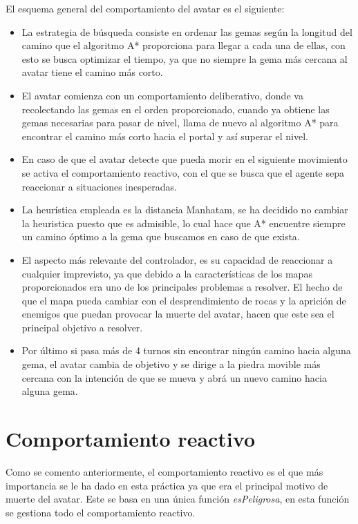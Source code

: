 \documentclass[size=a4, parskip=half, titlepage=false, toc=flat, toc=bib, 12pt]{scrartcl}
\begin{document}
El esquema general del comportamiento del avatar es el siguiente:
\begin{itemize}
\item La estrategia de búsqueda consiste en ordenar las gemas según la longitud del camino que el algoritmo A*
proporciona para llegar a cada una de ellas, con esto se busca optimizar el
tiempo, ya que no siempre la gema más cercana al avatar tiene el camino más corto.

\item El avatar comienza con un comportamiento deliberativo, donde va recolectando
las gemas en el orden proporcionado, cuando ya obtiene las gemas necesarias para
pasar de nivel, llama de nuevo al algoritmo A* para encontrar el camino más corto
hacia el portal y así superar el nivel.

\item En caso de que el avatar detecte que pueda morir en el siguiente movimiento
se activa el comportamiento reactivo, con el que se busca que el agente
sepa reaccionar a situaciones inesperadas.

\item La heurística empleada es la distancia Manhatam, se ha decidido no cambiar
la heuristica puesto que es admisible, lo cual hace que A*
 encuentre siempre un camino óptimo a la gema que buscamos en caso de que exista.

\item El aspecto más relevante del controlador, es su capacidad de reaccionar
a cualquier imprevisto, ya que debido a la características de los mapas
proporcionados era uno de los principales problemas a resolver. El hecho de que
el mapa pueda cambiar con el desprendimiento de rocas y la aprición de enemigos
que puedan provocar la muerte del avatar, hacen que este sea el principal objetivo
a resolver.

\item Por último si pasa más de 4 turnos sin encontrar ningún camino hacia alguna
gema, el avatar cambia de objetivo y se dirige a la piedra movible más cercana con
la intención de que se mueva y abrá un nuevo camino hacia alguna gema.
\end{itemize}

\newpage

\section{Comportamiento reactivo}
Como se comento anteriormente, el comportamiento reactivo es el que más importancia
se le ha dado en esta práctica ya que era el principal motivo de muerte del avatar.
Este se basa en una única función \textit{esPeligrosa}, en esta función se gestiona
todo el comportamiento reactivo.
\end{document}
